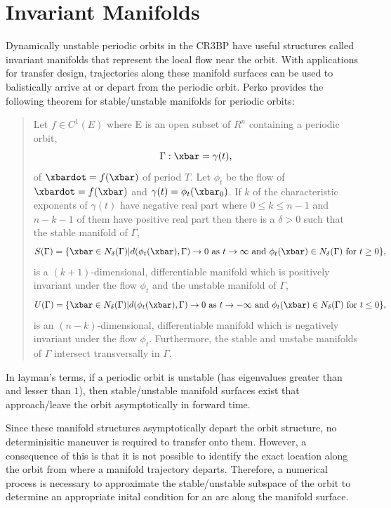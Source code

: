 \section{Invariant Manifolds}
Dynamically unstable periodic orbits in the CR3BP have useful structures called invariant manifolds
that represent the local flow near the orbit. With applications for transfer design, trajectories
along these manifold surfaces can be used to balistically arrive at or depart from the periodic
orbit. Perko provides the following theorem for stable/unstable manifolds for periodic
orbits\cite{Perko:1991}:
\begin{quote}
    Let $f\in C^{1}(E)$ where E is an open subset of $R^{n}$ containing a periodic orbit,
    \begin{equation}
        \Gamma:\xbar=\gamma(t),
    \end{equation}
    of $\xbardot=f(\xbar)$ of period $T$. Let $\phi_{t}$ be the flow of $\xbardot=f(\xbar)$ and
    $\gamma(t)=\phi_{t}(\xbar_{0})$. If $k$ of the characteristic exponents of $\gamma(t)$ have
    negative real part where $0\leq k\leq n-1$ and $n-k-1$ of them have positive real part then
    there is a $\delta>0$ such that the stable manifold of $\Gamma$,
    \begin{equation}
        S(\Gamma)=\{\xbar\in N_{\delta}(\Gamma)|d(\phi_{t}(\xbar),\Gamma)\rightarrow0\text{ as }t\rightarrow\infty\text{ and }\phi_{t}(\xbar)\in N_{\delta}(\Gamma)\text{ for }t\geq0\},
    \end{equation}
    is a $(k+1)$-dimensional, differentiable manifold which is positively invariant under the flow
    $\phi_{t}$ and the unstable manifold of $\Gamma$,
    \begin{equation}
        U(\Gamma)=\{\xbar\in N_{\delta}(\Gamma)|d(\phi_{t}(\xbar),\Gamma)\rightarrow0\text{ as }t\rightarrow-\infty\text{ and }\phi_{t}(\xbar)\in N_{\delta}(\Gamma)\text{ for }t\leq0\},
    \end{equation}
    is an $(n-k)$-dimensional, differentiable manifold which is negatively invariant under the flow
    $\phi_{t}$. Furthermore, the stable and unstabe manifolds of $\Gamma$ intersect transversally
    in $\Gamma$.
\end{quote}
In layman's terms, if a periodic orbit is unstable (has eigenvalues greater than and lesser than
$1$), then stable/unstable manifold surfaces exist that approach/leave the orbit asymptotically in
forward time.

Since these manifold structures asymptotically depart the orbit structure, no determinisitic
maneuver is required to transfer onto them. However, a consequence of this is that it is not
possible to identify the exact location along the orbit from where a manifold trajectory departs.
Therefore, a numerical process is necessary to approximate the stable/unstable subspace of the
orbit to determine an appropriate inital condition for an arc along the manifold surface.

